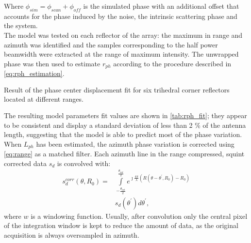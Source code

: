 Where $\phi_{sim} = \phi_{scan} + \phi_{off}$ is the simulated phase with an additional offset that accounts for the phase induced by the noise, the intrinsic scattering phase and the system.\\
The model was tested on each reflector of the array: the maximum in range and azimuth was identified and the samples corresponding to the half power beamwidth were extracted at the range of maximum intensity. The unwrapped phase was then used to estimate $r_{ph}$ according to the procedure described in \autoref{eq:rph_estimation}.



\begin{table}[ht]
	\centering
	\caption{Result of the phase center displacement fit for six trihedral corner reflectors located at different ranges.}
	\label{tab:rph_fit}
\end{table}
The resulting model parameters fit values  are shown in \autoref{tab:rph_fit}; they appear to be consistent and display a standard deviation of less than 2 \% of the antenna length, suggesting that the model is able to predict most of the phase variation.\\
When $L_{ph}$ has been estimated, the azimuth phase variation is corrected using \autoref{eq:range} as a matched filter. Each azimuth line in the range compressed, squint corrected data $s_{d}$ is convolved with:
\begin{equation}\label{eq:correction}
	\begin{aligned}
		s_{d}^{corr}\left(\theta, R_{0}\right) = &\int\limits_{-\frac{\theta_{int}}{2}}^{\frac{\theta_{int}}{2}}e^{\jmath \frac{4\pi}{\lambda}\left(R\left(\theta - \theta^{\prime}, R_{0}\right) - R_{0}\right)}\\
		&s_{d}\left(\theta^\prime\right) d\theta^\prime,
	\end{aligned}
\end{equation}
where $w$ is a windowing function. Usually, after convolution only the central pixel of the integration window is kept to reduce the amount of data, as the original acquisition is always oversampled in azimuth.
